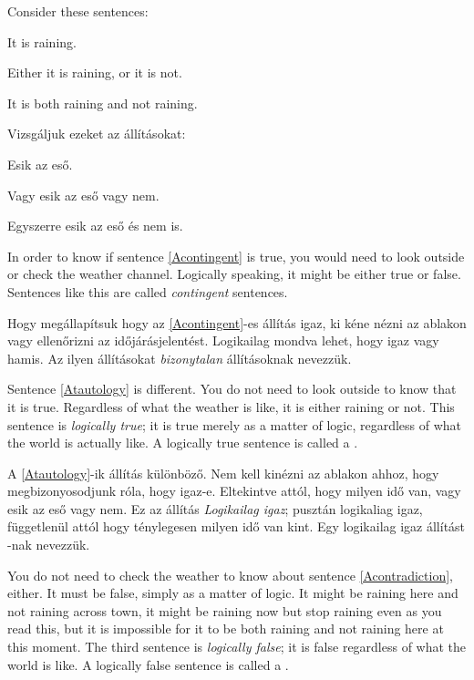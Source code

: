 Consider these sentences:
\begin{earg}
\item[\ex{Acontingent}] It is raining.
\item[\ex{Atautology}] Either it is raining, or it is not.
\item[\ex{Acontradiction}] It is both raining and not raining.
\end{earg}

Vizsgáljuk ezeket az állításokat:
\begin{earg}
\item[\ex{Acontingent}] Esik az eső.
\item[\ex{Atautology}] Vagy esik az eső vagy nem.
\item[\ex{Acontradiction}] Egyszerre esik az eső és nem is.
\end{earg}

In order to know if sentence \ref{Acontingent} is true, you would need to look outside or check the weather channel. Logically speaking, it might be either true or false. Sentences like this are called \emph{contingent} sentences.

Hogy megállapítsuk hogy az \ref{Acontingent}-es állítás igaz, ki kéne nézni az ablakon vagy ellenőrizni az időjárásjelentést. Logikailag mondva lehet, hogy igaz vagy hamis. Az ilyen állításokat \emph{bizonytalan} állításoknak nevezzük.
 
Sentence \ref{Atautology} is different. You do not need to look outside to know that it is true. Regardless of what the weather is like, it is either raining or not. This sentence is \emph{logically true}; it is true merely as a matter of logic, regardless of what the world is actually like. A logically true sentence is called a .

A \ref{Atautology}-ik állítás különböző. Nem kell kinézni az ablakon ahhoz, hogy megbizonyosodjunk róla, hogy igaz-e. Eltekintve attól, hogy milyen idő van, vagy esik az eső vagy nem. Ez az állítás \emph{Logikailag igaz}; pusztán logikaliag igaz, függetlenül attól hogy ténylegesen milyen idő van kint. Egy logikailag igaz állítást -nak nevezzük.

You do not need to check the weather to know about sentence \ref{Acontradiction}, either. It must be false, simply as a matter of logic. It might be raining here and not raining across town, it might be raining now but stop raining even as you read this, but it is impossible for it to be both raining and not raining here at this moment. The third sentence is \emph{logically false}; it is false regardless of what the world is like. A logically false sentence is called a .

